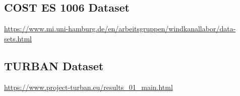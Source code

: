 \subsection{COST ES 1006 Dataset}
\url{https://www.mi.uni-hamburg.de/en/arbeitsgruppen/windkanallabor/data-sets.html}\newline

\subsection{TURBAN Dataset}
\url{https://www.project-turban.eu/results_01_main.html}



